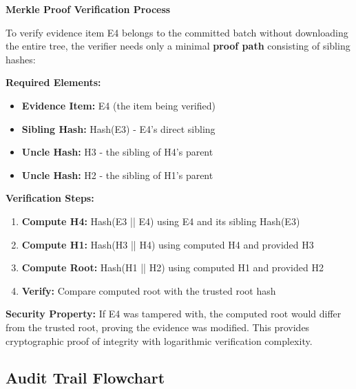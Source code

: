 \documentclass[12pt,a4paper]{article}
\begin{document}
\begin{technicalbox}
\textbf{Merkle Proof Verification Process}

To verify evidence item E4 belongs to the committed batch without downloading the entire tree, the verifier needs only a minimal \textbf{proof path} consisting of sibling hashes:

\textbf{Required Elements:}
\begin{itemize}
\item \textbf{Evidence Item:} E4 (the item being verified)
\item \textbf{Sibling Hash:} Hash(E3) - E4's direct sibling
\item \textbf{Uncle Hash:} H3 - the sibling of H4's parent 
\item \textbf{Uncle Hash:} H2 - the sibling of H1's parent
\end{itemize}

\textbf{Verification Steps:}
\begin{enumerate}
\item \textbf{Compute H4:} Hash(E3 || E4) using E4 and its sibling Hash(E3)
\item \textbf{Compute H1:} Hash(H3 || H4) using computed H4 and provided H3
\item \textbf{Compute Root:} Hash(H1 || H2) using computed H1 and provided H2
\item \textbf{Verify:} Compare computed root with the trusted root hash
\end{enumerate}

\textbf{Security Property:} If E4 was tampered with, the computed root would differ from the trusted root, proving the evidence was modified. This provides cryptographic proof of integrity with logarithmic verification complexity.
\end{technicalbox}

\subsection{Audit Trail Flowchart}
\end{document}
